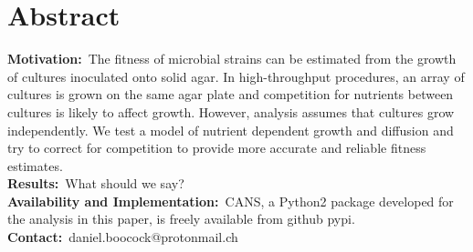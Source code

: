 \section*{Abstract}
\label{sec:abstract}

\textbf{Motivation:}~The fitness of microbial strains can be estimated
from the growth of cultures inoculated onto solid agar. In
high-throughput procedures, an array of cultures is grown on the same
agar plate and competition for nutrients between cultures is likely to
affect growth. However, analysis assumes that cultures grow
independently. We test a model of nutrient dependent growth and
diffusion and try to
correct for competition to provide more accurate and reliable fitness estimates.\\
\textbf{Results:}~What should we say?\\
\textbf{Availability and Implementation:}~CANS, a Python2 package developed for the analysis in this paper, is freely available from github pypi.\\
\textbf{Contact:}~daniel.boocock@protonmail.ch\\

